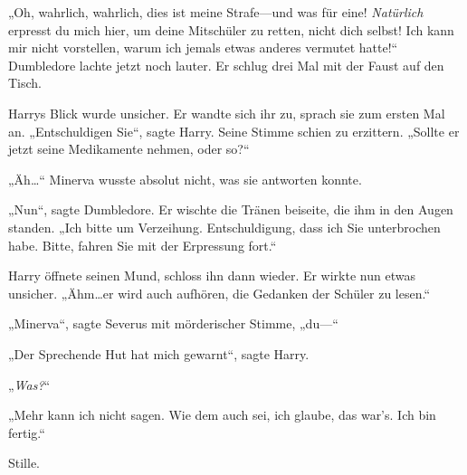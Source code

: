 „Oh, wahrlich, wahrlich, dies ist meine Strafe—und was für eine! \emph{Natürlich} erpresst du mich hier, um deine Mitschüler zu retten, nicht dich selbst! Ich kann mir nicht vorstellen, warum ich jemals etwas anderes vermutet hatte!“ Dumbledore lachte jetzt noch lauter. Er schlug drei Mal mit der Faust auf den Tisch.

Harrys Blick wurde unsicher. Er wandte sich ihr zu, sprach sie zum ersten Mal an. „Entschuldigen Sie“, sagte Harry. Seine Stimme schien zu erzittern. „Sollte er jetzt seine Medikamente nehmen, oder so?“

„Äh…“ Minerva wusste absolut nicht, was sie antworten konnte.

„Nun“, sagte Dumbledore. Er wischte die Tränen beiseite, die ihm in den Augen standen. „Ich bitte um Verzeihung. Entschuldigung, dass ich Sie unterbrochen habe. Bitte, fahren Sie mit der Erpressung fort.“

Harry öffnete seinen Mund, schloss ihn dann wieder. Er wirkte nun etwas unsicher. „Ähm…er wird auch aufhören, die Gedanken der Schüler zu lesen.“

„Minerva“, sagte Severus mit mörderischer Stimme, „du—“

„Der Sprechende Hut hat mich gewarnt“, sagte Harry.

„\emph{Was?}“

„Mehr kann ich nicht sagen. Wie dem auch sei, ich glaube, das war’s. Ich bin fertig.“

Stille.

